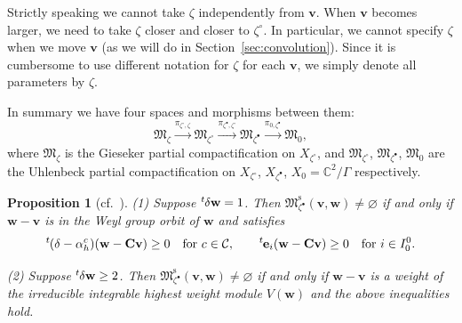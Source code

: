 \documentclass[pdftex]{sigma}
\newtheorem{Proposition}[equation]{Proposition}
\theoremstyle{definition}
\numberwithin{equation}{section}
\newcommand{\secref}[1]{Section~\ref{#1}}
\newcommand{\lsp}[2]{{\mskip-.3mu}{}^{#1}\mskip-1mu{#2}}
\newcommand{\C}{{\mathbb C}}
\newcommand{\M}{{\mathfrak M}} %
\newcommand{\Mreg}{\M^{\operatorname{s}}}
\newcommand{\bv}{{\mathbf v}} %
\newcommand{\bw}{{\mathbf w}} %
\newcommand{\bC}{{\mathbf C}} %
\newcommand{\be}{{\mathbf e}}
\begin{document}
Strictly speaking we cannot take $\zeta$ independently from $\bv$.
When $\bv$ becomes larger, we need to take $\zeta$ closer and closer
to $\zeta^\circ$. In particular, we cannot specify $\zeta$ when we
move $\bv$ (as we will do in \secref{sec:convolution}). Since it is
cumbersome to use dif\/ferent notation for $\zeta$ for each $\bv$, we
simply denote all parameters by $\zeta$.

In summary we have four spaces and morphisms between them:
\begin{equation*}
   \M_{\zeta} \xrightarrow{\pi_{\zeta^\circ,\zeta}}
   \M_{\zeta^\circ}\xrightarrow{\pi_{\zeta^\bullet,\zeta^\circ}}
   \M_{\zeta^\bullet}\xrightarrow{\pi_{0,\zeta^\bullet}}
   \M_0,
\end{equation*}
where $\M_{\zeta}$ is the Gieseker partial compactif\/ication on
$X_{\zeta^\circ}$, and $\M_{\zeta^\circ}$, $\M_{\zeta^\bullet}$,
$\M_0$ are the Uhlenbeck partial compactif\/ication on
$X_{\zeta^\circ}$, $X_{\zeta^\bullet}$, $X_0 = \C^2/\Gamma$ respectively.

\begin{Proposition}[cf.~]
\label{prop:affinemodulistrata}
\textup{(1)} Suppose $\lsp{t}{\delta}\bw = 1$.
%
Then $\Mreg_{\zeta^\bullet}(\bv,\bw) \neq\varnothing$ if and only if
$\bw - \bv$ is in the Weyl group orbit of $\bw$ and satisfies
\[
  \lsp{t}{(\delta-\alpha^c_h)}(\bw - \bC\bv)\ge 0
  \quad\text{for $c\in\mathcal C$}, \qquad
  \lsp{t}{\be_i}(\bw - \bC\bv)\ge 0 \quad\text{for $i\in I_0^0$}.
\]

\textup{(2)} Suppose $\lsp{t}{\delta}\bw \ge 2$.
%
Then $\Mreg_{\zeta^\bullet}(\bv,\bw) \neq \varnothing$ if and only if
$\bw-\bv$ is a weight of the irreducible integrable highest weight
module $V(\bw)$ and the above inequalities hold.
\end{Proposition}
\end{document}
